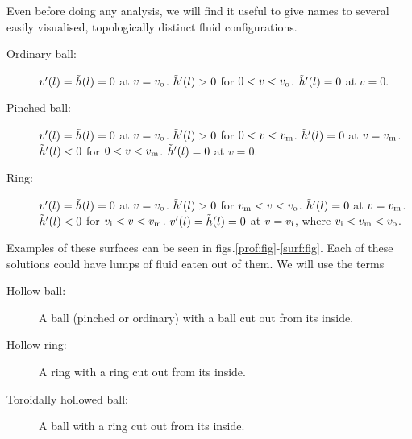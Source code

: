 
Even before doing any analysis, we will find it useful to give names
to several easily visualised, topologically distinct fluid
configurations.


%
%
\begin{description}
  \item[Ordinary ball:] $v'(l)=\tilde h(l)=0$ at $v=v_\mathrm{o}$. $\tilde h'(l)>0$ for
  $0<v<v_\mathrm{o}$. $\tilde h'(l)=0$ at $v=0$.
  \item[Pinched ball:] $v'(l)=\tilde h(l)=0$ at $v=v_\mathrm{o}$. $\tilde h'(l)>0$ for
  $0<v<v_\mathrm{m}$. $\tilde h'(l)=0$ at $v=v_\mathrm{m}$. $\tilde h'(l)<0$ for $0<v<v_\mathrm{m}$.
  $\tilde h'(l)=0$ at $v=0$.
  \item[Ring:] $v'(l)=\tilde h(l)=0$ at $v=v_\mathrm{o}$. $\tilde h'(l)>0$ for $v_\mathrm{m}<v<v_\mathrm{o}$.
  $\tilde h'(l)=0$ at $v=v_\mathrm{m}$. $\tilde h'(l)<0$ for $v_\mathrm{i}<v<v_\mathrm{m}$. $v'(l)=\tilde h(l)=0$
  at $v=v_\mathrm{i}$, where $v_\mathrm{i}<v_\mathrm{m}<v_\mathrm{o}$.
\end{description}
%
Examples of these surfaces can be seen in
figs.\ref{prof:fig}-\ref{surf:fig}. Each of these solutions could
have lumps of fluid eaten out of them. We will use the terms
%
\begin{description}
  \item[Hollow ball:] A ball (pinched or ordinary) with a ball cut out from its inside.
  \item[Hollow ring:] A ring with a ring cut out from its inside.
  \item[Toroidally hollowed ball:] A ball with a ring cut out from its inside.
\end{description}

